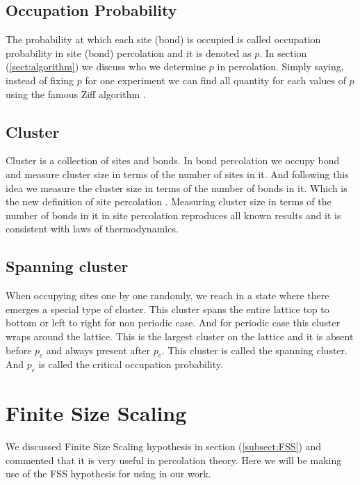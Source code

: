 	\subsection{Occupation Probability} \label{subsect:occupation-probability}
	The probability at which each site (bond) is occupied is called occupation probability in site (bond) percolation and it is denoted as $p$. In section (\ref{sect:algorithm}) we discuss who we determine $p$ in percolation. Simply saying, instead of fixing $p$ for one experiment we can find all quantity for each values of $p$ using the famous Ziff algorithm \cite{Newman2000, Newman2001}.
	
	\subsection{Cluster}
	Cluster is a collection of sites and bonds. In bond percolation we occupy bond and measure cluster size in terms of the number of sites in it. And following this idea we measure the cluster size in terms of the number of bonds in it. Which is the new definition of site percolation \cite{redefinition-of-site-percolation}. Measuring cluster size in terms of the number of bonds in it in site percolation reproduces all known results and it is consistent with laws of thermodynamics.
	
	\subsection{Spanning cluster}
	When occupying sites one by one randomly, we reach in a state where there emerges a special type of cluster. This cluster spans the entire lattice top to bottom or left to right for non periodic case. And for periodic case this cluster wraps around the lattice. This is the largest cluster on the lattice and it is absent before $p_c$ and always present after $p_c$. This cluster is called the spanning cluster. And $p_c$ is called the critical occupation probability.


\section{Finite Size Scaling}
	\label{sect:fss}
	We discussed Finite Size Scaling hypothesis in section (\ref{subsect:FSS}) and commented that it is very useful in percolation theory. Here we will be making use of the FSS hypothesis for using in our work.
	
